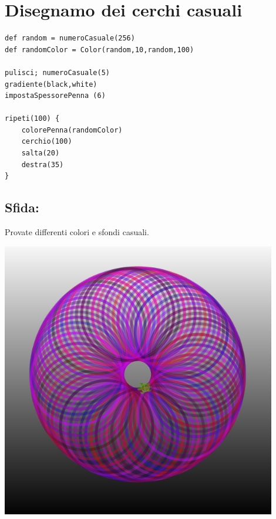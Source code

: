 \chapter{Disegnamo dei cerchi casuali}
\begin{multicols}{2}

\begin{lstlisting}[basicstyle={\ttfamily\fontsize{16}{19}\selectfont},numbers=none]
def random = numeroCasuale(256)
def randomColor = Color(random,10,random,100) 

pulisci; numeroCasuale(5)
gradiente(black,white)
impostaSpessorePenna (6)

ripeti(100) {
    colorePenna(randomColor)
    cerchio(100)
    salta(20)
    destra(35)
}
\end{lstlisting}
        
\section*{\color{BrickRed}Sfida:}
Provate differenti colori e sfondi casuali.


\columnbreak


\begin{center}
\includegraphics[width=12.0cm]{../img/circle-of-circles.png}
\end{center}

\end{multicols}

